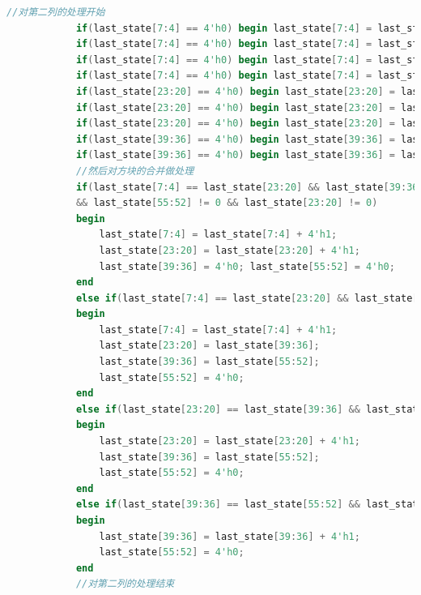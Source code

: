 \documentclass[UTF8]{article}
\begin{document}
\begin{lstlisting}[language=Verilog]
			//对第二列的处理开始
			if(last_state[7:4] == 4'h0) begin last_state[7:4] = last_state[23:20]; last_state[23:20] = last_state[39:36]; last_state[39:36] = last_state[55:52]; last_state[55:52] = 0; end
			if(last_state[7:4] == 4'h0) begin last_state[7:4] = last_state[23:20]; last_state[23:20] = last_state[39:36]; last_state[39:36] = last_state[55:52]; last_state[55:52] = 0; end
			if(last_state[7:4] == 4'h0) begin last_state[7:4] = last_state[23:20]; last_state[23:20] = last_state[39:36]; last_state[39:36] = last_state[55:52]; last_state[55:52] = 0; end
			if(last_state[7:4] == 4'h0) begin last_state[7:4] = last_state[23:20]; last_state[23:20] = last_state[39:36]; last_state[39:36] = last_state[55:52]; last_state[55:52] = 0; end
			if(last_state[23:20] == 4'h0) begin last_state[23:20] = last_state[39:36]; last_state[39:36] = last_state[55:52]; last_state[55:52] = 0; end
			if(last_state[23:20] == 4'h0) begin last_state[23:20] = last_state[39:36]; last_state[39:36] = last_state[55:52]; last_state[55:52] = 0; end
			if(last_state[23:20] == 4'h0) begin last_state[23:20] = last_state[39:36]; last_state[39:36] = last_state[55:52]; last_state[55:52] = 0; end
			if(last_state[39:36] == 4'h0) begin last_state[39:36] = last_state[55:52]; last_state[55:52] = 0; end
			if(last_state[39:36] == 4'h0) begin last_state[39:36] = last_state[55:52]; last_state[55:52] = 0; end
			//然后对方块的合并做处理
			if(last_state[7:4] == last_state[23:20] && last_state[39:36] == last_state[55:52]
			&& last_state[55:52] != 0 && last_state[23:20] != 0)
			begin
				last_state[7:4] = last_state[7:4] + 4'h1;
				last_state[23:20] = last_state[23:20] + 4'h1;
				last_state[39:36] = 4'h0; last_state[55:52] = 4'h0;
			end
			else if(last_state[7:4] == last_state[23:20] && last_state[23:20] != 0)
			begin
				last_state[7:4] = last_state[7:4] + 4'h1;
				last_state[23:20] = last_state[39:36];
				last_state[39:36] = last_state[55:52]; 
				last_state[55:52] = 4'h0;
			end
			else if(last_state[23:20] == last_state[39:36] && last_state[23:20] != 0)
			begin
				last_state[23:20] = last_state[23:20] + 4'h1;
				last_state[39:36] = last_state[55:52];
				last_state[55:52] = 4'h0;
			end
			else if(last_state[39:36] == last_state[55:52] && last_state[55:52] != 0)
			begin
				last_state[39:36] = last_state[39:36] + 4'h1; 
				last_state[55:52] = 4'h0;
			end
			//对第二列的处理结束
			

\end{lstlisting}
\end{document}

